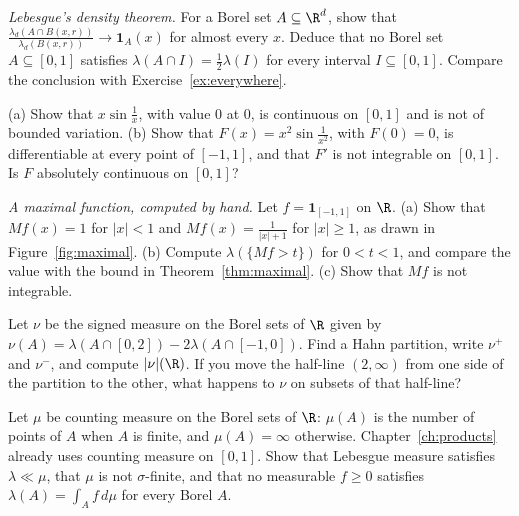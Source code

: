 \begin{exercise}[$\star\star$]\label{ex:density}
\emph{Lebesgue's density theorem.} For a Borel set $A\subseteq\R^d$, show that $\frac{\lambda_d(A\cap B(x,r))}{\lambda_d(B(x,r))}\to\mathbf 1_A(x)$ for almost every $x$. Deduce that no Borel set $A\subseteq[0,1]$ satisfies
$\lambda(A\cap I)=\frac12\lambda(I)$ for every interval $I\subseteq[0,1]$. Compare the conclusion with Exercise~\ref{ex:everywhere}.
\end{exercise}

\begin{exercise}[$\star\star$]\label{ex:variation}
(a) Show that $x\sin\frac1x$, with value $0$ at $0$, is continuous on $[0,1]$ and is not of bounded variation. (b) Show that $F(x)=x^2\sin\frac1{x^2}$, with $F(0)=0$, is differentiable at every point of $[-1,1]$, and that
$F'$ is not integrable on $[0,1]$. Is $F$ absolutely continuous on $[0,1]$?
\end{exercise}

\begin{exercise}[$\star$]\label{ex:maximalcompute}
\emph{A maximal function, computed by hand.} Let $f=\mathbf 1_{[-1,1]}$ on $\R$. (a) Show that $Mf(x)=1$ for $|x|<1$ and $Mf(x)=\frac1{|x|+1}$ for $|x|\ge1$, as drawn in Figure~\ref{fig:maximal}.
(b) Compute $\lambda(\{Mf>t\})$ for $0<t<1$, and compare the value with the bound in Theorem~\ref{thm:maximal}. (c) Show that $Mf$ is not integrable.
\end{exercise}

\begin{exercise}[$\star$]\label{ex:v7c11a}
Let $\nu$ be the signed measure on the Borel sets of $\R$ given by $\nu(A)=\lambda(A\cap[0,2])-2\lambda(A\cap[-1,0])$. Find a Hahn partition, write $\nu^+$ and $\nu^-$, and compute $|\nu|(\R)$. If you move the half-line $(2,\infty)$ from one side of the partition to the other, what happens to $\nu$ on subsets of that half-line?
\end{exercise}

\begin{exercise}[$\star\star$]\label{ex:v7c11b}
Let $\mu$ be counting measure on the Borel sets of $\R$: $\mu(A)$ is the number of points of $A$ when $A$ is finite, and $\mu(A)=\infty$ otherwise. Chapter~\ref{ch:products} already uses counting measure on $[0,1]$. Show that Lebesgue measure satisfies $\lambda\ll\mu$, that $\mu$ is not $\sigma$-finite, and that no measurable $f\ge0$ satisfies $\lambda(A)=\int_Af\,d\mu$ for every Borel $A$.
\end{exercise}

